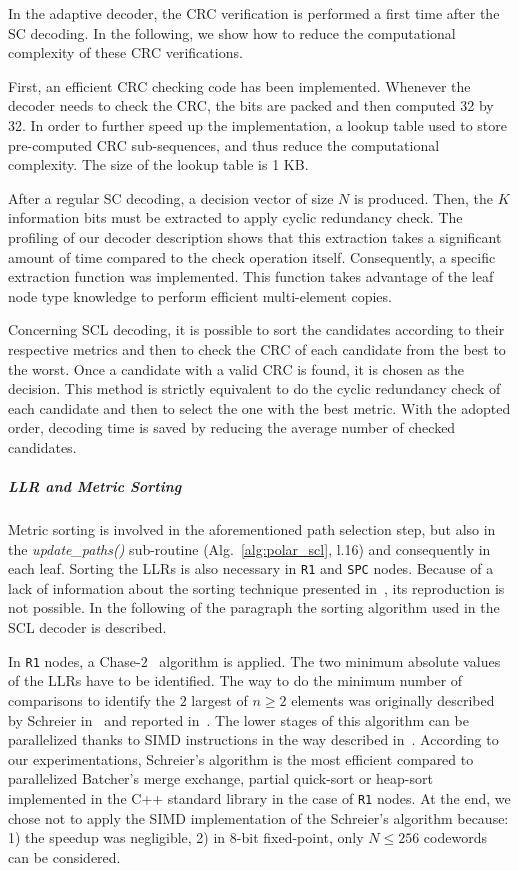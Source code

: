 In the adaptive decoder, the CRC verification is performed a first time after
the SC decoding. In the following, we show how to reduce the computational
complexity of these CRC verifications.

First, an efficient CRC checking code has been implemented. Whenever the decoder
needs to check the CRC, the bits are packed and then computed 32 by 32. In order
to further speed up the implementation, a lookup table used to store
pre-computed CRC sub-sequences, and thus reduce the computational complexity.
The size of the lookup table is 1 KB.

After a regular SC decoding, a decision vector of size $N$ is produced. Then,
the $K$ information bits must be extracted to apply cyclic redundancy check. The
profiling of our decoder description shows that this extraction takes a
significant amount of time compared to the check operation itself. Consequently,
a specific extraction function was implemented. This function takes advantage of
the leaf node type knowledge to perform efficient multi-element copies.

Concerning SCL decoding, it is possible to sort the candidates according to
their respective metrics and then to check the CRC of each candidate from the
best to the worst. Once a candidate with a valid CRC is found, it is chosen as
the decision. This method is strictly equivalent to do the cyclic redundancy
check of each candidate and then to select the one with the best metric. With
the adopted order, decoding time is saved by reducing the average number of
checked candidates.

\subparagraph{LLR and Metric Sorting}
\label{sec:polar_sorting}

Metric sorting is involved in the aforementioned path selection step, but also
in the \textit{update\_paths()} sub-routine (Alg.~\ref{alg:polar_scl}, l.16) and
consequently in each leaf. Sorting the LLRs is also necessary in \texttt{R1} and
\texttt{SPC} nodes. Because of a lack of information about the sorting technique
presented in~\cite{Sarkis2016}, its reproduction is not possible. In the
following of the paragraph the sorting algorithm used in the SCL decoder is
described.

In \texttt{R1} nodes, a Chase-$2$~\cite{Chase1972} algorithm is applied. The two
minimum absolute values of the LLRs have to be identified. The way to do the
minimum number of comparisons to identify the $2$ largest of $n\geq2$ elements
was originally described by Schreier in~\cite{Schreier1932} and reported
in~\cite{Knuth1973}. The lower stages of this algorithm can be parallelized
thanks to SIMD instructions in the way described in~\cite{Furtak2007}. According
to our experimentations, Schreier's algorithm is the most efficient compared to
parallelized Batcher's merge exchange, partial quick-sort or heap-sort
implemented in the C++ standard library in the case of \texttt{R1} nodes. At the
end, we chose not to apply the SIMD implementation of the Schreier's algorithm
because: 1) the speedup was negligible, 2) in 8-bit fixed-point, only
$N \leq 256$ codewords can be considered.

